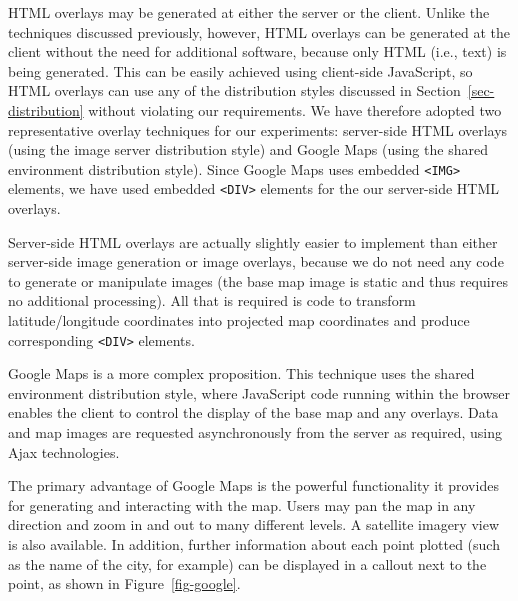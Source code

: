 \documentclass[acmtocl,acmnow]{acmtrans2m}
\begin{document}
HTML overlays may be generated at either the server or the client.
Unlike the techniques discussed previously, however, HTML overlays can
be generated at the client without the need for additional software,
because only HTML (i.e., text) is being generated. This can be easily
achieved using client-side JavaScript, so HTML overlays can use any of
the distribution styles discussed in Section~\ref{sec-distribution}
without violating our requirements. We have therefore adopted two
representative overlay techniques for our experiments: server-side HTML
overlays (using the image server distribution style) and Google Maps
(using the shared environment distribution style). Since Google Maps
uses embedded \verb|<IMG>| elements, we have used embedded \verb|<DIV>|
elements for the our server-side HTML overlays.

Server-side HTML overlays are actually slightly easier to implement than
either server-side image generation or image overlays, because we do not
need any code to generate or manipulate images (the base map image is
static and thus requires no additional processing). All that is required
is code to transform latitude/longitude coordinates into projected map
coordinates and produce corresponding \verb|<DIV>| elements.

Google Maps \cite{Goog-M-2006-maps} is a more complex proposition. This
technique uses the shared environment distribution style, where
JavaScript code running within the browser enables the client to control
the display of the base map and any overlays. Data and map images are
requested asynchronously from the server as required, using Ajax
technologies.

The primary advantage of Google Maps is the powerful functionality it
provides for generating and interacting with the map. Users may pan the
map in any direction and zoom in and out to many different levels. A
satellite imagery view is also available. In addition, further
information about each point plotted (such as the name of the city, for
example) can be displayed in a callout next to the point, as shown in
Figure~\ref{fig-google}.
\end{document}
